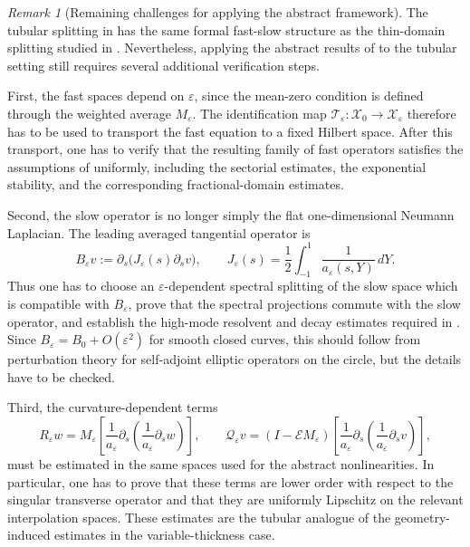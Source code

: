 \documentclass[11pt]{article}
\theoremstyle{definition}
\theoremstyle{remark}
\newtheorem{remark}[theorem]{Remark}
\numberwithin{equation}{section}
\begin{document}
\begin{remark}[Remaining challenges for applying the abstract framework]
\label{rem:tubular-remaining-challenges}
The tubular splitting in  has the same formal
fast-slow structure as the thin-domain splitting studied in
. Nevertheless, applying the abstract results of
 to the tubular setting still requires several additional
verification steps.

First, the fast spaces depend on \(\varepsilon\), since the mean-zero
condition is defined through the weighted average \(M_\varepsilon\). The
identification map \(\mathcal T_\varepsilon:\mathcal X_0\to\mathcal X_\varepsilon\)
therefore has to be used to transport the fast equation to a fixed Hilbert
space. After this transport, one has to verify that the resulting family of
fast operators satisfies the assumptions of  uniformly,
including the sectorial estimates, the exponential stability, and the
corresponding fractional-domain estimates.

Second, the slow operator is no longer simply the flat one-dimensional
Neumann Laplacian. The leading averaged tangential operator is
\[
B_\varepsilon v
:=
\partial_s\!\bigl(J_\varepsilon(s)\partial_s v\bigr),
\qquad
J_\varepsilon(s)
=
\frac12\int_{-1}^1\frac{1}{a_\varepsilon(s,Y)}\,dY .
\]
Thus one has to choose an \(\varepsilon\)-dependent spectral splitting of the
slow space which is compatible with \(B_\varepsilon\), prove that the
spectral projections commute with the slow operator, and establish the
high-mode resolvent and decay estimates required in
. Since \(B_\varepsilon=B_0+O(\varepsilon^2)\) for
smooth closed curves, this should follow from perturbation theory for
self-adjoint elliptic operators on the circle, but the details have to be
checked.

Third, the curvature-dependent terms
\[
R_\varepsilon w
=
M_\varepsilon\!\left[
\frac{1}{a_\varepsilon}
\partial_s\!\left(\frac{1}{a_\varepsilon}\partial_s w\right)
\right],
\qquad
\mathcal Q_\varepsilon v
=
(I-\mathcal E M_\varepsilon)
\left[
\frac{1}{a_\varepsilon}
\partial_s\!\left(\frac{1}{a_\varepsilon}\partial_s v\right)
\right],
\]
must be estimated in the same spaces used for the abstract nonlinearities.
In particular, one has to prove that these terms are lower order with respect
to the singular transverse operator and that they are uniformly Lipschitz on
the relevant interpolation spaces. These estimates are the tubular analogue
of the geometry-induced estimates in the variable-thickness case.


\end{remark}
\end{document}
